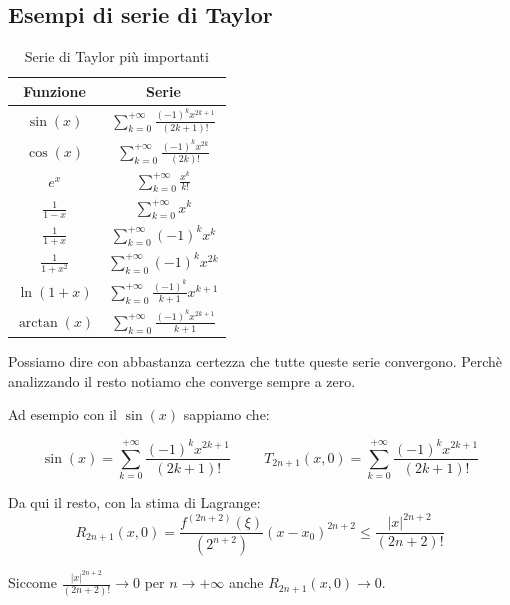 \subsection*{Esempi di serie di Taylor}
\begin{table}[ht]
    \centering
    \begin{tabular}{|c|c|}
        \hline Funzione & Serie\\\hline\hline
         $\sin(x)$ & $\sum^{+\infty}_{k=0}\frac{(-1)^kx^{2k+1}}{(2k+1)!}$\\\hline
         $\cos(x)$ & $\sum^{+\infty}_{k=0}\frac{(-1)^kx^{2k}}{(2k)!}$\\\hline
         $e^x$ & $\sum^{+\infty}_{k=0}\frac{x^k}{k!}$\\\hline
         $\frac{1}{1-x}$ & $\sum^{+\infty}_{k=0}x^k$\\\hline
         $\frac{1}{1+x}$ & $\sum^{+\infty}_{k=0}(-1)^kx^k$\\\hline
         $\frac{1}{1+x^2}$ & $\sum^{+\infty}_{k=0}(-1)^kx^{2k}$\\\hline
         $\ln(1+x)$ & $\sum^{+\infty}_{k=0}\frac{(-1)^k}{k+1}x^{k+1}$\\\hline
         $\arctan(x)$ & $\sum^{+\infty}_{k=0}\frac{(-1)^kx^{2k+1}}{k+1}$\\\hline
    \end{tabular}
    \caption{Serie di Taylor più importanti}
    \label{tab:sere_di_taylor}
\end{table}

Possiamo dire con abbastanza certezza che tutte queste serie convergono. Perchè analizzando il resto notiamo che converge sempre a zero.

\begin{example}
Ad esempio con il $\sin(x)$ sappiamo che:

\begin{equation*}
    \sin(x)=\sum^{+\infty}_{k=0}\frac{(-1)^kx^{2k+1}}{(2k+1)!}\hspace{1cm}T_{2n+1}(x,0)=\sum^{+\infty}_{k=0}\frac{(-1)^kx^{2k+1}}{(2k+1)!}
\end{equation*}

Da qui il resto, con la stima di Lagrange:
\begin{equation*}
    R_{2n+1}(x,0)=\frac{f^{(2n+2)}(\xi)}{(2^{n+2})}(x-x_0)^{2n+2}\leq \frac{|x|^{2n+2}}{(2n+2)!}
\end{equation*}

Siccome $\frac{|x|^{2n+2}}{(2n+2)!}\to0$ per $n\to+\infty$ anche $R_{2n+1}(x,0)\to0$.
\end{example}

